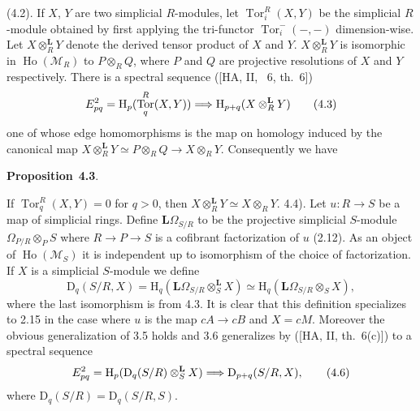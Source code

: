 \documentclass[10pt,reqno]{amsart}
\DeclareMathOperator{\Tor}{Tor}
\DeclareMathOperator{\Ho}{Ho}
\newenvironment{prop}[1]{
\par\medskip\noindent\textbf{Proposition}~\textbf{#1}.\,\itshape
}
\newcommand{\Lra}{\Longrightarrow}
\newcommand{\cat}{\mathcal}
\newcommand{\M}{\cat{M}}
\renewcommand{\L}{\mathbf{L}}
\renewcommand{\H}{\mathrm{H}}
\newcommand{\D}{\mathrm{D}}
\newcommand{\Diff}{\Omega}
\newcommand{\LD}{\L\Diff}
\begin{document}
(4.2). If $X$, $Y$ are two simplicial $R$-modules, let $\Tor_i^R(X,Y)$ be the simplicial $R$-module
obtained by first applying the tri-functor $\Tor_i^-(-,-)$ dimension-wise. Let $X\otimes_R^\L Y$ denote
the derived tensor product of $X$ and $Y$. $X\otimes_R^\L Y$ is isomorphic in $\Ho(\M_R)$ to
$P\otimes_R Q$, where $P$ and $Q$ are projective resolutions of $X$ and $Y$ respectively. There is a
spectral sequence ([HA, II, \textsection~6, th.~6])
\[
  E_{pq}^2=\H_p(\Tor_q^R(X,Y))\Lra\H_{p+q}(X\otimes_R^\L Y)\tag{4.3}
\]
one of whose edge homomorphisms is the map on homology induced by the canonical map
$X\otimes_R^\L Y\simeq P\otimes_R Q\to X\otimes_R Y$. Consequently we have

\begin{prop}{4.3}
If $\Tor_q^R(X,Y)=0$ for $q>0$, then $X\otimes_R^\L Y\simeq X\otimes_R Y$.
\end{prop}

(4.4). Let $u:R\to S$ be a map of simplicial rings. Define $\LD_{S/R}$ to be the projective
simplicial $S$-module $\Diff_{P/R}\otimes_P S$ where $R\to P\to S$ is a cofibrant factorization of $u$
(2.12). As an object of $\Ho(\M_S)$ it is independent up to isomorphism of the choice of factorization.
If $X$ is a simplicial $S$-module we define
\[
  \D_q(S/R,X)=\H_q(\LD_{S/R}\otimes_S^\L X)\simeq\H_q(\LD_{S/R}\otimes_S X),\tag{4.5}
\]
where the last isomorphism is from 4.3. It is clear that this definition specializes to 2.15
in the case where $u$ is the map $cA\to cB$ and $X=cM$. Moreover the obvious generalization of 3.5
holds and 3.6 generalizes by ([HA, II, th.~6(c)]) to a spectral sequence
\[
  E_{pq}^2=\H_p(\D_q(S/R)\otimes_S^\L X)\Lra\D_{p+q}(S/R,X),\tag{4.6}
\]
where $\D_q(S/R)=\D_q(S/R,S)$.
\end{document}
